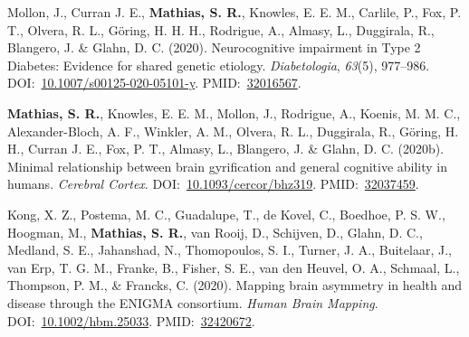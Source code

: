 \documentclass[10pt]{article}
\makeatletter
\newlength{\bibhang}
\newlength{\bibsep}
 {\@listi \global\bibsep\itemsep \global\advance\bibsep by\parsep}
\newenvironment{bibsection}%
        {\vspace{-\baselineskip}\begin{list}{}{%
       \setlength{\leftmargin}{\bibhang}%
       \setlength{\itemindent}{-\leftmargin}%
       \setlength{\itemsep}{\bibsep}%
       \setlength{\parsep}{\z@}%
        \setlength{\partopsep}{0pt}%
        \setlength{\topsep}{0pt}}}
        {\end{list}\vspace{-.6\baselineskip}}
\makeatother
\begin{document}
\begin{bibsection}
\item Mollon, J., Curran J. E., \textbf{Mathias, S. R.}, Knowles, E. E. M., Carlile, P., Fox, P. T., Olvera, R. L., G\"oring, H. H. H., Rodrigue, A., Almasy, L., Duggirala, R., Blangero, J. \& Glahn, D. C. (2020). Neurocognitive impairment in Type 2 Diabetes: Evidence for shared genetic etiology. \emph{Diabetologia}, \emph{63}(5), 977--986. DOI:~\href{https://doi.org/10.1007/s00125-020-05101-y}{10.1007/s00125-020-05101-y}. PMID:~\href{https://www.ncbi.nlm.nih.gov/pubmed/?term=32016567}{32016567}.

\item \textbf{Mathias, S. R.}, Knowles, E. E. M., Mollon, J., Rodrigue, A., Koenis, M. M. C., Alexander-Bloch, A. F., Winkler, A. M., Olvera, R. L., Duggirala, R., G\"oring, H. H., Curran J. E., Fox, P. T., Almasy, L., Blangero, J. \& Glahn, D. C. (2020b). Minimal relationship between brain gyrification and general cognitive ability in humans. \emph{Cerebral Cortex}. DOI:~\href{https://doi.org/10.1093/cercor/bhz319}{10.1093/cercor/bhz319}. PMID:~\href{https://www.ncbi.nlm.nih.gov/pubmed/?term=32037459}{32037459}.

\item Kong, X. Z., Postema, M. C., Guadalupe, T., de Kovel, C., Boedhoe, P. S. W., Hoogman, M., \textbf{Mathias, S. R.}, van Rooij, D., Schijven, D., Glahn, D. C., Medland, S. E., Jahanshad, N., Thomopoulos, S. I., Turner, J. A., Buitelaar, J., van Erp, T. G. M., Franke, B., Fisher, S. E., van den Heuvel, O. A., Schmaal, L., Thompson, P. M., \& Francks, C. (2020). Mapping brain asymmetry in health and disease through the ENIGMA consortium. \emph{Human Brain Mapping}. DOI:~\href{https://doi.org/10.1002/hbm.25033}{10.1002/hbm.25033}. PMID:~\href{https://www.ncbi.nlm.nih.gov/pubmed/?term=32420672}{32420672}.


\end{bibsection}
\end{document}
